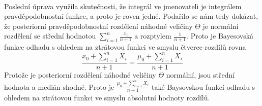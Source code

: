 \begin{example}
\begin{gather*}
\end{gather*}
Poslední úprava využila skutečnosti, že integrál ve jmenovateli je integrálem pravděpodobnostní funkce, a proto je roven jedné. Podařilo se nám tedy dokázat, že posteriorní pravděpodobnostní rozdělení náhodné veličiny $\Theta$ je normální rozdělení se střední hodnotou $\sum_{i = 1}^n \frac{x_i}{n + 1}$ a rozptylem $\frac{1}{n + 1}$. Proto je Bayesovská funkce odhadu s ohledem na ztrátovou funkci ve smyslu čtverce rozdílů rovna
\begin{equation*}
\frac{x_0 + \sum_{i = 1}^n X_i}{n + 1} = \frac{\mu_0 + \sum_{i = 1}^n X_i}{n + 1}
\end{equation*}
Protože je posteriorní rozdělení náhodné veličiny $\Theta$ normální, jsou střední hodnota a medián shodné. Proto je $\frac{\mu_0 + \sum_{i = 1}^n X_i}{n + 1}$ také Baysovskou funkcí odhadu s ohledem na ztrátovou funkci ve smyslu absolutní hodnoty rozdílů.
\end{example}

